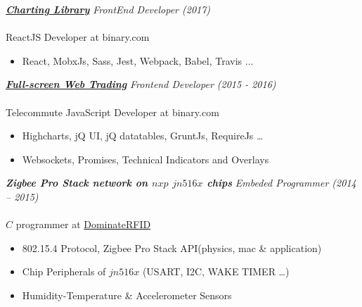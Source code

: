 \documentclass{article}
\newcommand{\hh}[1]{\large{\textit{\textbf{#1}}}}
\renewcommand{\i}[1]{\normalsize{\textit{#1}}}
\begin{document}
\hh{\href{https://charts.binary.com}{Charting Library}} \hfill \i{FrontEnd Developer (2017)} \\ \vspace {-.35cm} \\
ReactJS Developer at binary.com \\ \vspace{-.9cm}
\begin{itemize}
 \setlength{\itemsep}{1pt} \setlength{\parskip}{0pt} \setlength{\parsep}{0pt}
    \item React, MobxJs, Sass, Jest, Webpack, Babel, Travis ...
\end{itemize}  \vspace{-.1cm}

\hh{\href{https://webtrader.binary.com}{Full-screen Web Trading}} \hfill \i{Frontend Developer (2015 - 2016)} \\ \vspace {-.35cm} \\
Telecommute JavaScript Developer at binary.com \\ \vspace{-.9cm}
\begin{itemize}
 \setlength{\itemsep}{1pt} \setlength{\parskip}{0pt} \setlength{\parsep}{0pt}
    \item Highcharts, jQ UI, jQ datatables, GruntJs, RequireJs \dots
    \item Websockets, Promises, Technical Indicators and Overlays
\end{itemize}

\hh{Zigbee Pro Stack network on $nxp$ $jn516x$ chips} \hfill \i{Embeded Programmer (2014 -- 2015)} \\ \vspace{-.35cm} \\
$C$ programmer at \href{http://www.dominaterfid.com/}{DominateRFID} \\ \vspace{-.9cm}
\begin{itemize}
 \setlength{\itemsep}{1pt} \setlength{\parskip}{0pt} \setlength{\parsep}{0pt}
    \item 802.15.4 Protocol, Zigbee Pro Stack API(physics, mac \& application)
    \item Chip Peripherals of $jn516x$ (USART, I2C, WAKE TIMER \dots)
    \item Humidity-Temperature \& Accelerometer Sensors
\end{itemize}
\end{document}
